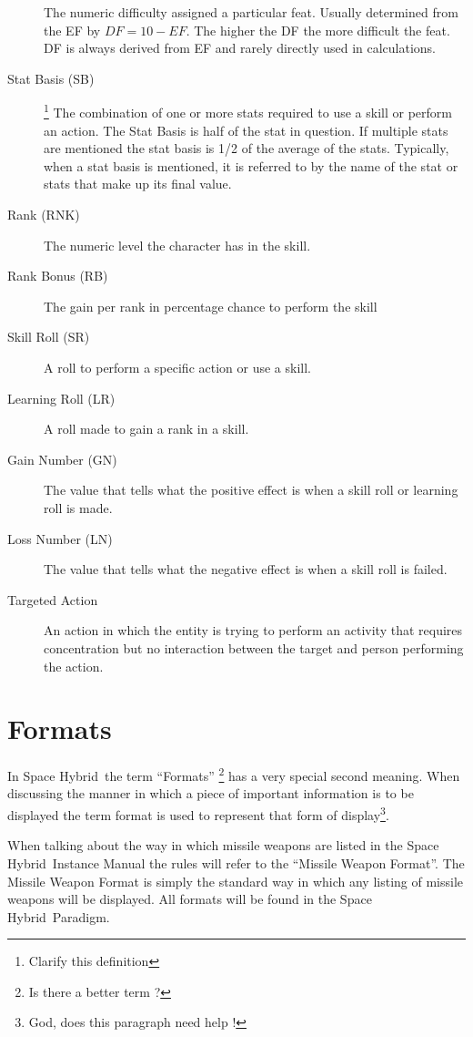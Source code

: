 \begin{description}
	The numeric difficulty assigned a particular feat. Usually determined from
	the EF by \(DF = 10-EF\). The higher the DF the more difficult the feat. DF is
	always derived from EF and rarely directly used in calculations.
	\item[Stat Basis (SB)] \footnote{Clarify this definition}
	The combination of one or more stats required to use a skill or perform an
    action. The Stat Basis is half of the stat in question. If 
	multiple stats are mentioned the stat basis is 1/2 of the average 
	of the stats. Typically, when a stat basis is mentioned, it is referred 
	to by the name of the stat or stats that make up its final value.
	\item[Rank (RNK)] 
	The numeric level the character has in the skill.
	\item[Rank Bonus (RB)]
	The gain per rank in percentage chance to perform the skill
	\item[Skill Roll (SR)]
	A roll to perform a specific action or use a skill.
	\item[Learning Roll (LR)]
	A roll made to gain a rank in a skill.
	\item[Gain Number (GN)]
	The value that tells what the positive effect is when a skill roll or
	learning roll is made.
    \item[Loss Number (LN)] 
	The value that tells what the negative effect is when a skill roll 
	is failed.
	\item[Targeted Action] 
	An action in which the entity is trying to perform an activity 
	that requires concentration but no interaction between the target 
	and person performing the action.
\end{description}

\section{Formats}

In Space Hybrid\ the term ``Formats'' \footnote{Is there a better term ? }
has a very special second meaning. When discussing the manner in 
which a piece of important information is to be displayed the term 
format is used to represent that form of display\footnote{God, does 
this paragraph need help !}. 

When talking about the way in which missile weapons are listed in the 
Space Hybrid\ Instance Manual the rules will refer to the 
``Missile Weapon Format''. The Missile Weapon Format is simply the 
standard way in which any listing of missile weapons will be displayed.
All formats will be found in the Space Hybrid\ Paradigm.


